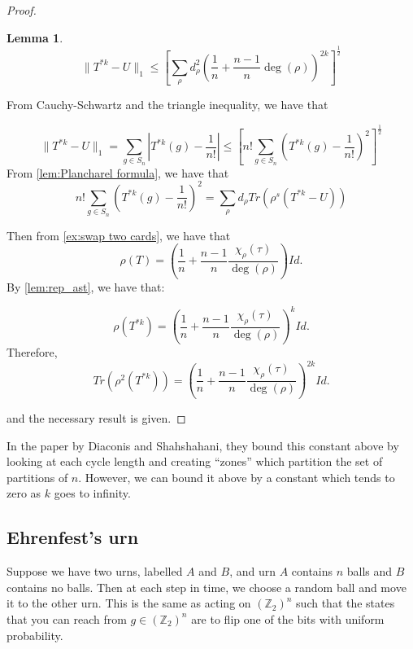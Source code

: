 \documentclass[]{article}
\newtheorem{lemma}[theorem]{Lemma}
\theoremstyle{definition}
\numberwithin{theorem}{section}
\numberwithin{equation}{section}
\begin{document}
\begin{proof}
	\begin{lemma}
	\begin{equation}
		\| T^{\ast k} - U \|_1 \leq \left[\sum_\rho d^2_\rho \left(\frac{1}{n} + \frac{n-1}{n} \deg(\rho)\right)^{2k}\right]^{\frac{1}{2}}
	\end{equation}
\end{lemma}

From Cauchy-Schwartz and the triangle inequality, we have that

\begin{equation}
	\| T^{\ast k} - U \|_1 = \sum_{g \in S_n} \left|T^{\ast k}(g) - \frac{1}{n!}\right| \leq \left[n! \sum_{g \in S_n} \left(T^{*k}(g) - \frac{1}{n!}\right)^2\right]^{\frac{1}{2}}
\end{equation}
From \cref{lem:Plancharel formula}, we have that
\begin{equation}
	n! \sum_{g \in S_n} \left(T^{*k}(g) - \frac{1}{n!}\right)^2 = \sum_\rho d_\rho Tr\left(\rho^s(T^{*k } - U)\right)
\end{equation}

Then from \cref{ex:swap two cards}, we have that
\begin{equation}
	\rho(T) = \left(\frac{1}{n} + \frac{n-1}{n} \frac{\chi_\rho(\tau)}{\deg(\rho)}\right) Id.
\end{equation}
By \cref{lem:rep_ast}, we have that:

\begin{equation}
	\rho(T^{* k}) = \left(\frac{1}{n} + \frac{n-1}{n} \frac{\chi_\rho(\tau)}{\deg(\rho)}\right)^k Id.
\end{equation}
Therefore,
\begin{equation}
	Tr(\rho^2(T^{* k})) = \left(\frac{1}{n} + \frac{n-1}{n} \frac{\chi_\rho(\tau)}{\deg(\rho)}\right)^{2k} Id.
\end{equation}

and the necessary result is given. 
\end{proof}

In the paper by Diaconis and Shahshahani\cite{diaconisGeneratingRandomPermutation1981}, they bound this constant above by looking at each cycle length and creating ``zones'' which partition the set of partitions of $n$. However, we can bound it above by a constant which tends to zero as $k$ goes to infinity. 
\subsection{Ehrenfest's urn}
Suppose we have two urns, labelled $A$ and $B$, and urn $A$ contains $n$ balls and $B$ contains no balls. Then at each step in time, we choose a random ball and move it to the other urn. This is the same as acting on $(\mathbb{Z}_2)^n$ such that the states that you can reach from $g \in (\mathbb{Z}_2)^n$ are to flip one of the bits with uniform probability. 
\end{document}

